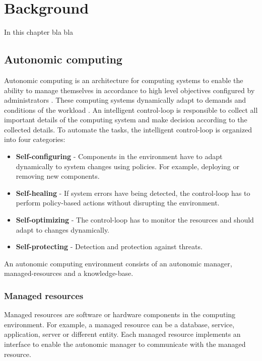 \chapter{Background}
\label{sec:demo}
%
In this chapter bla bla

\section{Autonomic computing}
Autonomic computing is an architecture for computing systems to enable the ability to manage themselves in accordance to high level objectives configured by administrators \cite{Kephart2003VisionComputing}. 
These computing systems dynamically adapt to demands and conditions of the workload \cite{Kephart2003VisionComputing}.
An intelligent control-loop is responsible to collect all important details of the computing system and make decision according to the collected details. To automate the tasks, the intelligent control-loop is organized into four categories:

\begin{itemize}
\item \textbf{Self-configuring}
- Components in the environment have to adapt dynamically to system changes using policies. For example, deploying or removing new components.

\item \textbf{Self-healing}
- If system errors have being detected, the control-loop has to perform policy-based actions without disrupting the 
environment.

\item \textbf{Self-optimizing}
- The control-loop has to monitor the resources and should adapt to changes dynamically.

\item \textbf{Self-protecting}
- Detection and protection against threats.

\end{itemize}

 An autonomic computing environment consists of an autonomic manager, managed-resources and a knowledge-base.
 
\subsection{Managed resources}
Managed resources are software or hardware components in the computing environment. For example, a managed resource 
can be a database, service, application, server or different entity. Each managed resource implements an interface to enable 
the autonomic manager to communicate with the managed resource. 

